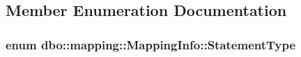 \subsection{Member Enumeration Documentation}
\hypertarget{classdbo_1_1mapping_1_1_mapping_info_a8edaff7685bc58254cd05ef19ad19c09}{
\subsubsection[{Statement\+Type}]{\setlength{\rightskip}{0pt plus 5cm}enum {\bf dbo\+::mapping\+::\+Mapping\+Info\+::\+Statement\+Type}}}\label{classdbo_1_1mapping_1_1_mapping_info_a8edaff7685bc58254cd05ef19ad19c09}
